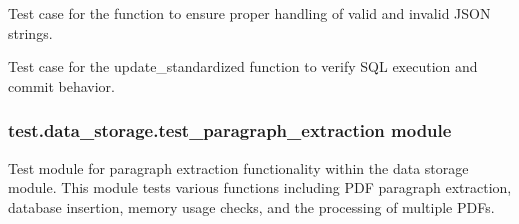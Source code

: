 \documentclass[letterpaper,10pt,english]{sphinxmanual}
\begin{document}

\begin{fulllineitems}
\label{\detokenize{test.data_storage:test.data_storage.test_llm_standardize.test_safe_json_parse_cleanup_and_errors}}
\pysigstartsignatures
\pysiglinewithargsret
{}
{}
{}
\pysigstopsignatures
\sphinxAtStartPar
Test case for the  function to ensure proper handling of valid and invalid JSON strings.

\end{fulllineitems}


\begin{fulllineitems}
\label{\detokenize{test.data_storage:test.data_storage.test_llm_standardize.test_update_standardized_execution}}
\pysigstartsignatures
\pysiglinewithargsret
{}
{}
{}
\pysigstopsignatures
\sphinxAtStartPar
Test case for the update\_standardized function to verify SQL execution and commit behavior.

\end{fulllineitems}



\subsubsection{test.data\_storage.test\_paragraph\_extraction module}
\label{\detokenize{test.data_storage:module-test.data_storage.test_paragraph_extraction}}\label{\detokenize{test.data_storage:test-data-storage-test-paragraph-extraction-module}}
\sphinxAtStartPar
Test module for paragraph extraction functionality within the data storage module.
This module tests various functions including PDF paragraph extraction, database insertion,
memory usage checks, and the processing of multiple PDFs.
\end{document}
